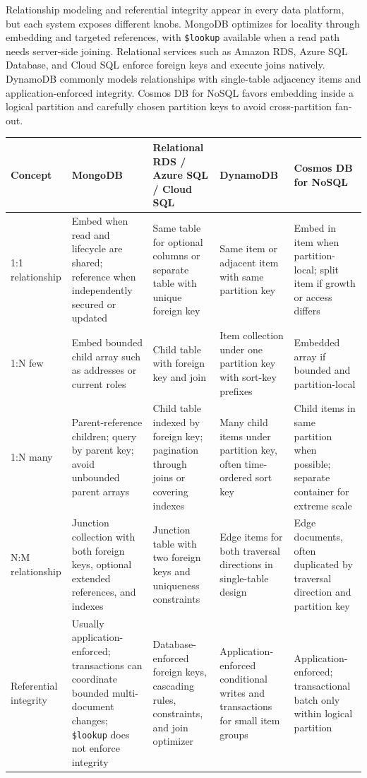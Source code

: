 \begin{crosscloud}
Relationship modeling and referential integrity appear in every data platform, but each system exposes different knobs. MongoDB optimizes for locality through embedding and targeted references, with \texttt{\$lookup} available when a read path needs server-side joining. Relational services such as Amazon RDS, Azure SQL Database, and Cloud SQL enforce foreign keys and execute joins natively. DynamoDB commonly models relationships with single-table adjacency items and application-enforced integrity. Cosmos DB for NoSQL favors embedding inside a logical partition and carefully chosen partition keys to avoid cross-partition fan-out.

\vspace{2mm}
{\footnotesize
\begin{tabular}{@{}p{2.4cm}p{3.0cm}p{3.1cm}p{3.1cm}p{3.1cm}@{}}
\toprule
\textbf{Concept} & \textbf{MongoDB} & \textbf{Relational RDS / Azure SQL / Cloud SQL} & \textbf{DynamoDB} & \textbf{Cosmos DB for NoSQL} \\
\midrule
1:1 relationship & Embed when read and lifecycle are shared; reference when independently secured or updated & Same table for optional columns or separate table with unique foreign key & Same item or adjacent item with same partition key & Embed in item when partition-local; split item if growth or access differs \\
1:N few & Embed bounded child array such as addresses or current roles & Child table with foreign key and join & Item collection under one partition key with sort-key prefixes & Embedded array if bounded and partition-local \\
1:N many & Parent-reference children; query by parent key; avoid unbounded parent arrays & Child table indexed by foreign key; pagination through joins or covering indexes & Many child items under partition key, often time-ordered sort key & Child items in same partition when possible; separate container for extreme scale \\
N:M relationship & Junction collection with both foreign keys, optional extended references, and indexes & Junction table with two foreign keys and uniqueness constraints & Edge items for both traversal directions in single-table design & Edge documents, often duplicated by traversal direction and partition key \\
Referential integrity & Usually application-enforced; transactions can coordinate bounded multi-document changes; \texttt{\$lookup} does not enforce integrity & Database-enforced foreign keys, cascading rules, constraints, and join optimizer & Application-enforced conditional writes and transactions for small item groups & Application-enforced; transactional batch only within logical partition \\

\end{tabular}}
\end{crosscloud}
